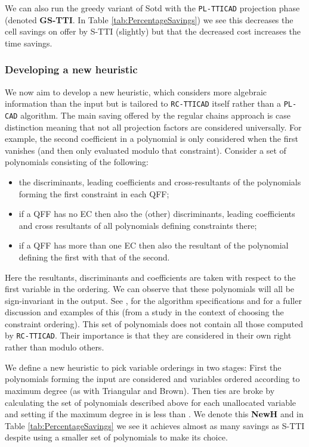 \documentclass[runningheads,a4paper]{llncs}
\begin{document}
We can also run the greedy variant of Sotd with the \texttt{PL-TTICAD} projection phase (denoted \textbf{GS-TTI}.  In Table \ref{tab:PercentageSavings}) we see this decreases the cell savings on offer by S-TTI (slightly) but that the decreased cost increases the time savings.  

\subsubsection{Developing a new heuristic}

We now aim to develop a new heuristic, which considers more algebraic information than the input but is tailored to \texttt{RC-TTICAD} itself rather than a \texttt{PL-CAD} algorithm.  
The main saving offered by the regular chains approach is case distinction meaning that not all projection factors are considered universally.  For example, the second coefficient in a polynomial is only considered when the first vanishes (and then only evaluated modulo that constraint).  Consider a set of polynomials consisting of the following:
\begin{itemize}
\item the discriminants, leading coefficients and cross-resultants of the polynomials forming the first constraint in each QFF;
\item if a QFF has no EC then also the (other) discriminants, leading coefficients and cross resultants of all polynomials defining constraints there;
\item if a QFF has more than one EC then also the resultant of the polynomial defining the first with that of the second.
\end{itemize}
Here the resultants, discriminants and coefficients are taken with respect to the first variable in the ordering.  We can observe that these polynomials will all be sign-invariant in the output.  See \cite{BCDEMW14}, \cite{CM12b} for the algorithm specifications and \cite{EBCDMW14} for a fuller discussion and examples of this (from a study in the context of choosing the constraint ordering).  This set of polynomials does not contain all those computed by \texttt{RC-TTICAD}.
Their importance is that they are considered in their own right rather than modulo others.  

We define a new heuristic to pick variable orderings in two stages:  First the polynomials forming the input are considered and variables ordered according to maximum degree (as with Triangular and Brown).  Then ties are broke by calculating the set of polynomials described above for each unallocated variable and setting  if the maximum degree in  is less than .  We denote this \textbf{NewH} and in Table \ref{tab:PercentageSavings} we see it achieves almost as many savings as S-TTI despite using a smaller set of polynomials to make its choice.  
\end{document}
